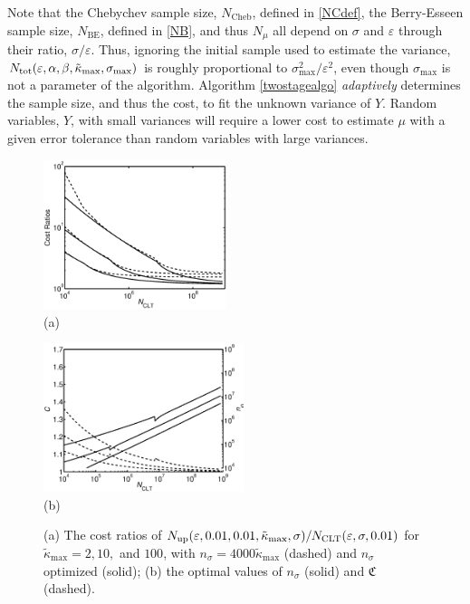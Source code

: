 \documentclass[graybox]{svmult}
\newcommand{\fudge}{\mathfrak{C}}
\newcommand{\tkappa}{\tilde{\kappa}}
\begin{document}
Note that the Chebychev sample size, $N_{\text{Cheb}}$, defined in \eqref{NCdef}, the Berry-Esseen sample size, $N_{\text{BE}}$, defined in \eqref{NB}, and thus $N_\mu$ all depend on $\sigma$ and $\varepsilon$ through their ratio, $\sigma/\varepsilon$.  Thus, ignoring the initial sample used to estimate the variance, $N_{\rm{tot}}(\varepsilon,\alpha, \beta,\tkappa_{\max}, \sigma_{\max})$ is roughly proportional to $\sigma^2_{\max}/\varepsilon^{2}$, even though $\sigma_{\max}$ is not a parameter of the algorithm.  Algorithm \ref{twostagealgo} \emph{adaptively} determines the sample size, and thus the cost, to fit the unknown variance of $Y$. Random variables, $Y$, with small variances will require a lower cost to estimate $\mu$ with a given error tolerance than random variables with large variances. 


\begin{figure}
\centering
\begin{minipage}{2.1in}
\centering \includegraphics[width=2.1in]{MCSampleSizes} \\
(a)
\end{minipage}
\quad 
\begin{minipage}{2.3in}\centering
\includegraphics[width=2.3in]{MCnsigmafudge}\\
(b)
\end{minipage}
\caption{(a) The cost ratios of $N_{\rm{up}}(\varepsilon,0.01,0.01, \tkappa_{\max}, \sigma)/N_{\mathrm{CLT}}(\varepsilon,\sigma,0.01)$ for $\tkappa_{\max}=2, 10,$ and $100$, with $n_\sigma=4000\tkappa_{\max}$ (dashed) and $n_\sigma$ optimized (solid); (b) the optimal values of $n_\sigma$ (solid) and $\fudge$ (dashed).\label{Costfig}}
\end{figure}
\end{document}
